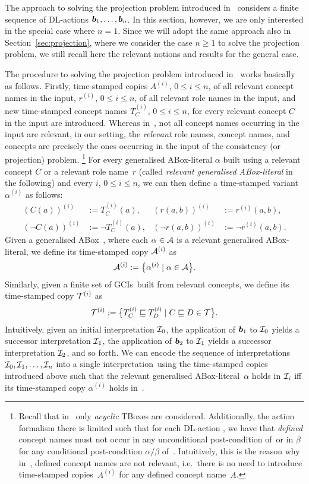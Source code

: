 \noindent
The approach to solving the projection problem introduced in~\cite{BLM+-AAAI05}
considers a finite sequence of DL-actions $\boldsymbol b_1,\dots,\boldsymbol b_n$.  In this
section, however, we are only interested in the special case where $n=1$.  Since
we will adopt the same approach also in Section~\ref{sec:projection}, where we
consider the case $n\ge 1$ to solve the projection problem, we still recall here
the relevant notions and results for the general case.

The procedure to solving the projection problem introduced in~\cite{BLM+-AAAI05}
works basically as follows.  Firstly, time-stamped copies $A^{(i)}$,
$0\le i\le n$, of all relevant concept names in the input, $r^{(i)}$,
$0\le i\le n$, of all relevant role names in the input, and new time-stamped
concept names $T_C^{(i)}$, $0\le i\le n$, for every relevant concept $C$ in the
input are introduced.  Whereas in~\cite{BLM+-AAAI05}, not all concept names
occurring in the input are relevant, in our setting, the \emph{relevant} role
names, concept names, and concepts are precisely the ones occurring in the input
of the consistency (or projection) problem.%
\footnote{Recall that in~\cite{BLM+-AAAI05} only \emph{acyclic} TBoxes are
    considered.  Additionally, the action formalism there is limited such that
    for each DL-action \abf, we have that \emph{defined} concept names must not
    occur in any unconditional post-condition of~\abf or in $\beta$ for any
    conditional post-condition $\alpha/\beta$ of~\abf.  Intuitively, this is the
    reason why in~\cite{BLM+-AAAI05}, defined concept names are not relevant,
    i.e.~there is no need to introduce time-stamped copies~$A^{(i)}$ for any
    defined concept name~$A$.}
%
For every generalised ABox-literal $\alpha$ built using a relevant concept $C$
or a relevant role name~$r$ (called \emph{relevant generalised ABox-literal} in
the following) and every $i$, $0\le i\le n$, we can then define a time-stamped
variant $\alpha^{(i)}$ as follows:
\begin{align*}
    (C(a))^{(i)}&:=T_C^{(i)}(a),
    &(r(a,b))^{(i)}&:=r^{(i)}(a,b),\\
    (\lnot C(a))^{(i)}&:=\lnot T_C^{(i)}(a),
    &(\lnot r(a,b))^{(i)}&:=\lnot r^{(i)}(a,b).
\end{align*}
%
Given a generalised ABox~\Amc, where each $\alpha\in\mathcal{A}$ is a relevant
generalised ABox-literal, we define its time-stamped copy $\mathcal{A}^{(i)}$ as
\[\mathcal{A}^{(i)}:=\bigl\{\alpha^{(i)}\mid\alpha\in\mathcal{A}\bigr\}.\]
%
Similarly, given a finite set of GCIs~\Tmc built from relevant concepts, we
define its time-stamped copy $\mathcal{T}^{(i)}$ as
\[\mathcal{T}^{(i)}:=\bigl\{T_C^{(i)}\sqsubseteq T_D^{(i)}\mid C\sqsubseteq D\in\mathcal{T}\bigr\}.\]
%
Intuitively, given an initial interpretation $\mathcal{I}_0$, the application of
$\boldsymbol b_1$ to $\mathcal{I}_0$ yields a successor interpretation $\mathcal{I}_1$, the application
of $\boldsymbol b_2$ to $\mathcal{I}_1$ yields a successor interpretation $\mathcal{I}_2$, and so
forth.  We can encode the sequence of interpretations
$\mathcal{I}_0,\mathcal{I}_1,\dots,\mathcal{I}_n$ into a single interpretation~\Jmc using the
time-stamped copies introduced above such that the relevant generalised
ABox-literal~$\alpha$ holds in $\mathcal{I}_i$ iff its time-stamped copy $\alpha^{(i)}$
holds in~\Jmc.

